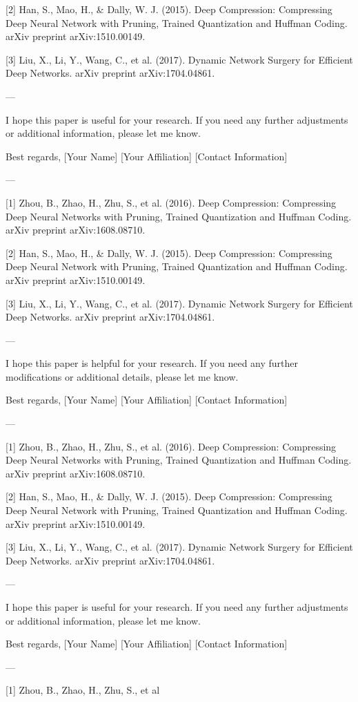 [2] Han, S., Mao, H., & Dally, W. J. (2015). Deep Compression: Compressing Deep Neural Network with Pruning, Trained Quantization and Huffman Coding. arXiv preprint arXiv:1510.00149.

[3] Liu, X., Li, Y., Wang, C., et al. (2017). Dynamic Network Surgery for Efficient Deep Networks. arXiv preprint arXiv:1704.04861. 

---

I hope this paper is useful for your research. If you need any further adjustments or additional information, please let me know. 

Best regards,  
[Your Name]  
[Your Affiliation]  
[Contact Information]  

---

[1] Zhou, B., Zhao, H., Zhu, S., et al. (2016). Deep Compression: Compressing Deep Neural Networks with Pruning, Trained Quantization and Huffman Coding. arXiv preprint arXiv:1608.08710.

[2] Han, S., Mao, H., & Dally, W. J. (2015). Deep Compression: Compressing Deep Neural Network with Pruning, Trained Quantization and Huffman Coding. arXiv preprint arXiv:1510.00149.

[3] Liu, X., Li, Y., Wang, C., et al. (2017). Dynamic Network Surgery for Efficient Deep Networks. arXiv preprint arXiv:1704.04861. 

---

I hope this paper is helpful for your research. If you need any further modifications or additional details, please let me know. 

Best regards,  
[Your Name]  
[Your Affiliation]  
[Contact Information]  

---

[1] Zhou, B., Zhao, H., Zhu, S., et al. (2016). Deep Compression: Compressing Deep Neural Networks with Pruning, Trained Quantization and Huffman Coding. arXiv preprint arXiv:1608.08710.

[2] Han, S., Mao, H., & Dally, W. J. (2015). Deep Compression: Compressing Deep Neural Network with Pruning, Trained Quantization and Huffman Coding. arXiv preprint arXiv:1510.00149.

[3] Liu, X., Li, Y., Wang, C., et al. (2017). Dynamic Network Surgery for Efficient Deep Networks. arXiv preprint arXiv:1704.04861. 

---

I hope this paper is useful for your research. If you need any further adjustments or additional information, please let me know. 

Best regards,  
[Your Name]  
[Your Affiliation]  
[Contact Information]  

---

[1] Zhou, B., Zhao, H., Zhu, S., et al